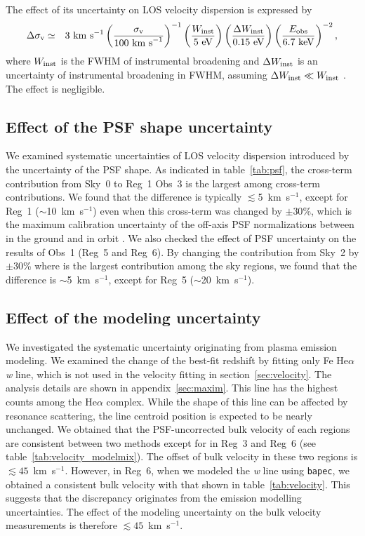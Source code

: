 The effect of its uncertainty on LOS velocity dispersion is expressed by
\begin{eqnarray}
\Delta \sigma_{\rm v} &\simeq& 3~{\rm km~s}^{-1}
\left(\frac{\sigma_{\rm v}}{100~{\rm km~s}^{-1}} \right)^{-1}
\left(\frac{W_{\rm inst}}{5~{\rm eV}} \right)
\left(\frac{\Delta W_{\rm inst}}{0.15~{\rm eV}}\right)
\left(\frac{E_{\rm obs}}{6.7~{\rm keV}} \right)^{-2},
\label{eq-deltavt2}
\end{eqnarray}
where $W_{\rm inst}$ is the FWHM of instrumental broadening and $\Delta W_{\rm inst}$ is an uncertainty of instrumental broadening in FWHM, assuming $\Delta W_{\rm inst} \ll W_{\rm inst}$ \citep[more details are shown in appendix of][]{kitayama-wp}. The effect is negligible.

\subsection{Effect of the PSF shape uncertainty}

We examined systematic uncertainties of LOS velocity dispersion introduced by the uncertainty of the PSF shape. As indicated in table~\ref{tab:psf}, the cross-term contribution from Sky~0 to Reg~1 Obs~3 is the largest among cross-term contributions. We found that the difference is typically $\lesssim$5~km~s$^{-1}$, except for Reg~1 ($\sim$10~km~s$^{-1}$) even when this cross-term was changed by $\pm30$\%, which is the maximum calibration uncertainty of the off-axis PSF normalizations between in the ground and in orbit \citep[][]{maeda17}. We also checked the effect of PSF uncertainty on the results of Obs~1 (Reg~5 and Reg~6). By changing the contribution from Sky~2 by $\pm 30$\% where is the largest contribution among the sky regions, we found that the difference is $\sim$5~km~s$^{-1}$, except for Reg~5 ($\sim$20~km~s$^{-1}$).

\subsection{Effect of the modeling uncertainty}
\label{sec:modeling}

We investigated the systematic uncertainty originating from plasma emission modeling. We examined the change of the best-fit redshift by fitting only Fe He$\alpha$ {\it w} line, which is not used in the velocity fitting in section~\ref{sec:velocity}. The analysis details are shown in appendix~\ref{sec:maxim}. This line has the highest counts among the He$\alpha$ complex. While the shape of this line can be affected by resonance scattering, the line centroid position is expected to be nearly unchanged. We obtained that the PSF-uncorrected bulk velocity of each regions are consistent between two methods except for in Reg~3 and Reg~6 (see table~\ref{tab:velocity_modelmix}). The offset of bulk velocity in these two regions is $\lesssim45$~km~s$^{-1}$. However, in Reg~6, when we modeled the {\it w} line using \verb+bapec+, we obtained a consistent bulk velocity with that shown in table~\ref{tab:velocity}. This suggests that the discrepancy originates from the emission modelling uncertainties. The effect of the modeling uncertainty on the bulk velocity measurements is therefore $\lesssim45$~km~s$^{-1}$.
